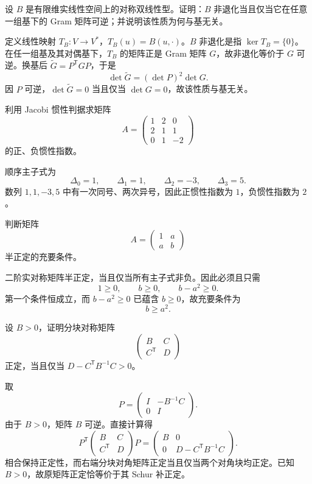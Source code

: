 \begin{exercise}[level=advanced]
设 $B$ 是有限维实线性空间上的对称双线性型。证明：$B$ 非退化当且仅当它在任意一组基下的 Gram 矩阵可逆；并说明该性质为何与基无关。
\begin{solution}
定义线性映射 $T_B:V\to V^*$，$T_B(u)=B(u,\cdot)$。$B$ 非退化是指 $\ker T_B=\{0\}$。在任一组基及其对偶基下，$T_B$ 的矩阵正是 Gram 矩阵 $G$，故非退化等价于 $G$ 可逆。换基后 $\widetilde G=P^{\mathsf T}GP$，于是
\[
\det\widetilde G=(\det P)^2\det G.
\]
因 $P$ 可逆，$\det\widetilde G=0$ 当且仅当 $\det G=0$，故该性质与基无关。
\end{solution}
\end{exercise}

\begin{exercise}[level=advanced]
利用 Jacobi 惯性判据求矩阵
\[
A=\begin{pmatrix}
1&2&0\\
2&1&1\\
0&1&-2
\end{pmatrix}
\]
的正、负惯性指数。
\begin{solution}
顺序主子式为
\[
\Delta_0=1,\qquad \Delta_1=1,\qquad
\Delta_2=-3,\qquad \Delta_3=5.
\]
数列 $1,1,-3,5$ 中有一次同号、两次异号，因此正惯性指数为 $1$，负惯性指数为 $2$。
\end{solution}
\end{exercise}

\begin{exercise}[level=advanced]
判断矩阵
\[
A=\begin{pmatrix}
1&a\\
a&b
\end{pmatrix}
\]
半正定的充要条件。
\begin{solution}
二阶实对称矩阵半正定，当且仅当所有主子式非负。因此必须且只需
\[
1\ge0,\qquad b\ge0,\qquad b-a^2\ge0.
\]
第一个条件恒成立，而 $b-a^2\ge0$ 已蕴含 $b\ge0$，故充要条件为
\[
b\ge a^2.
\]
\end{solution}
\end{exercise}

\begin{exercise}[level=advanced]
设 $B>0$，证明分块对称矩阵
\[
\begin{pmatrix}
B&C\\
C^{\mathsf T}&D
\end{pmatrix}
\]
正定，当且仅当 $D-C^{\mathsf T}B^{-1}C>0$。
\begin{solution}
取
\[
P=\begin{pmatrix}I&-B^{-1}C\\0&I\end{pmatrix}.
\]
由于 $B>0$，矩阵 $B$ 可逆。直接计算得
\[
P^{\mathsf T}
\begin{pmatrix}B&C\\C^{\mathsf T}&D\end{pmatrix}
P
=
\begin{pmatrix}
B&0\\
0&D-C^{\mathsf T}B^{-1}C
\end{pmatrix}.
\]
相合保持正定性，而右端分块对角矩阵正定当且仅当两个对角块均正定。已知 $B>0$，故原矩阵正定恰等价于其 Schur 补正定。
\end{solution}
\end{exercise}

